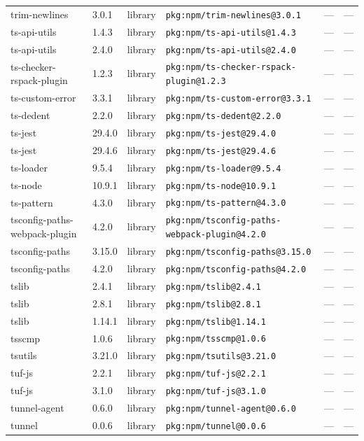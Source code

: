 \documentclass[11pt]{article}
\begin{document}
\begin{longtable}{|l|l|l|p{2.2cm}|l|p{4cm}|}
trim-newlines & 3.0.1 & library & \texttt{pkg:npm/trim-newlines@3.0.1} & — & — \\
ts-api-utils & 1.4.3 & library & \texttt{pkg:npm/ts-api-utils@1.4.3} & — & — \\
ts-api-utils & 2.4.0 & library & \texttt{pkg:npm/ts-api-utils@2.4.0} & — & — \\
ts-checker-rspack-plugin & 1.2.3 & library & \texttt{pkg:npm/ts-checker-rspack-plugin@1.2.3} & — & — \\
ts-custom-error & 3.3.1 & library & \texttt{pkg:npm/ts-custom-error@3.3.1} & — & — \\
ts-dedent & 2.2.0 & library & \texttt{pkg:npm/ts-dedent@2.2.0} & — & — \\
ts-jest & 29.4.0 & library & \texttt{pkg:npm/ts-jest@29.4.0} & — & — \\
ts-jest & 29.4.6 & library & \texttt{pkg:npm/ts-jest@29.4.6} & — & — \\
ts-loader & 9.5.4 & library & \texttt{pkg:npm/ts-loader@9.5.4} & — & — \\
ts-node & 10.9.1 & library & \texttt{pkg:npm/ts-node@10.9.1} & — & — \\
ts-pattern & 4.3.0 & library & \texttt{pkg:npm/ts-pattern@4.3.0} & — & — \\
tsconfig-paths-webpack-plugin & 4.2.0 & library & \texttt{pkg:npm/tsconfig-paths-webpack-plugin@4.2.0} & — & — \\
tsconfig-paths & 3.15.0 & library & \texttt{pkg:npm/tsconfig-paths@3.15.0} & — & — \\
tsconfig-paths & 4.2.0 & library & \texttt{pkg:npm/tsconfig-paths@4.2.0} & — & — \\
tslib & 2.4.1 & library & \texttt{pkg:npm/tslib@2.4.1} & — & — \\
tslib & 2.8.1 & library & \texttt{pkg:npm/tslib@2.8.1} & — & — \\
tslib & 1.14.1 & library & \texttt{pkg:npm/tslib@1.14.1} & — & — \\
tsscmp & 1.0.6 & library & \texttt{pkg:npm/tsscmp@1.0.6} & — & — \\
tsutils & 3.21.0 & library & \texttt{pkg:npm/tsutils@3.21.0} & — & — \\
tuf-js & 2.2.1 & library & \texttt{pkg:npm/tuf-js@2.2.1} & — & — \\
tuf-js & 3.1.0 & library & \texttt{pkg:npm/tuf-js@3.1.0} & — & — \\
tunnel-agent & 0.6.0 & library & \texttt{pkg:npm/tunnel-agent@0.6.0} & — & — \\
tunnel & 0.0.6 & library & \texttt{pkg:npm/tunnel@0.0.6} & — & — \\

\end{longtable}
\end{document}
